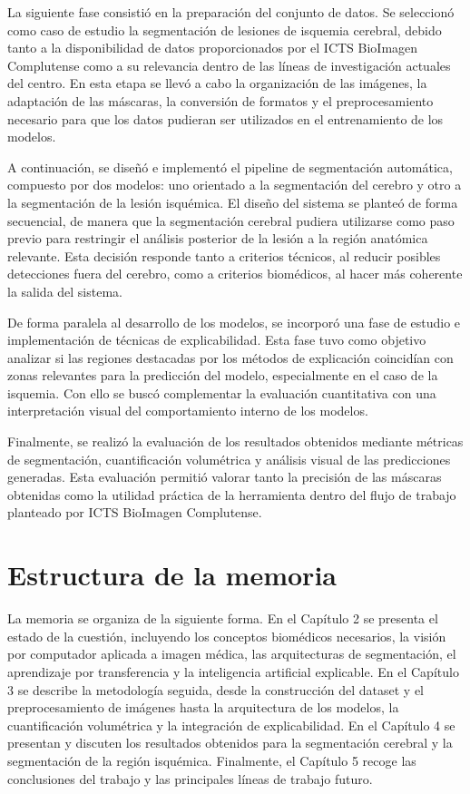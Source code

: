 La siguiente fase consistió en la preparación del conjunto de datos. Se seleccionó como caso de estudio la segmentación de lesiones de isquemia cerebral, debido tanto a la disponibilidad de datos proporcionados por el ICTS BioImagen Complutense como a su relevancia dentro de las líneas de investigación actuales del centro. En esta etapa se llevó a cabo la organización de las imágenes, la adaptación de las máscaras, la conversión de formatos y el preprocesamiento necesario para que los datos pudieran ser utilizados en el entrenamiento de los modelos.

A continuación, se diseñó e implementó el pipeline de segmentación automática, compuesto por dos modelos: uno orientado a la segmentación del cerebro y otro a la segmentación de la lesión isquémica. El diseño del sistema se planteó de forma secuencial, de manera que la segmentación cerebral pudiera utilizarse como paso previo para restringir el análisis posterior de la lesión a la región anatómica relevante. Esta decisión responde tanto a criterios técnicos, al reducir posibles detecciones fuera del cerebro, como a criterios biomédicos, al hacer más coherente la salida del sistema.

De forma paralela al desarrollo de los modelos, se incorporó una fase de estudio e implementación de técnicas de explicabilidad. Esta fase tuvo como objetivo analizar si las regiones destacadas por los métodos de explicación coincidían con zonas relevantes para la predicción del modelo, especialmente en el caso de la isquemia. Con ello se buscó complementar la evaluación cuantitativa con una interpretación visual del comportamiento interno de los modelos.

Finalmente, se realizó la evaluación de los resultados obtenidos mediante métricas de segmentación, cuantificación volumétrica y análisis visual de las predicciones generadas. Esta evaluación permitió valorar tanto la precisión de las máscaras obtenidas como la utilidad práctica de la herramienta dentro del flujo de trabajo planteado por ICTS BioImagen Complutense.

\section{Estructura de la memoria}

La memoria se organiza de la siguiente forma. En el Capítulo 2 se presenta el estado de la cuestión, incluyendo los conceptos biomédicos necesarios, la visión por computador aplicada a imagen médica, las arquitecturas de segmentación, el aprendizaje por transferencia y la inteligencia artificial explicable. En el Capítulo 3 se describe la metodología seguida, desde la construcción del dataset y el preprocesamiento de imágenes hasta la arquitectura de los modelos, la cuantificación volumétrica y la integración de explicabilidad. En el Capítulo 4 se presentan y discuten los resultados obtenidos para la segmentación cerebral y la segmentación de la región isquémica. Finalmente, el Capítulo 5 recoge las conclusiones del trabajo y las principales líneas de trabajo futuro.